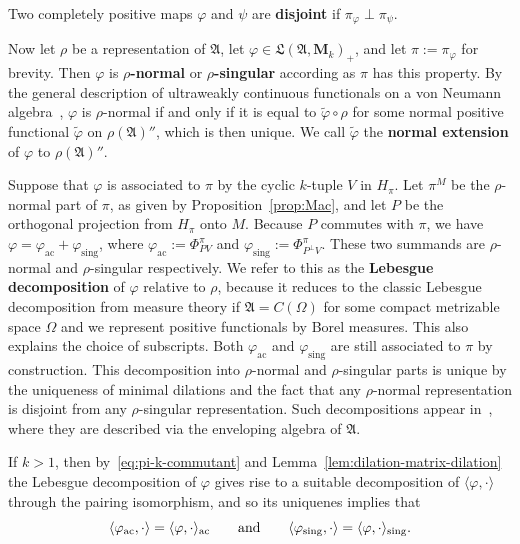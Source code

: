 \documentclass[12pt,a4paper]{article}
\numberwithin{equation}{section}
\theoremstyle{remark}
\renewcommand{\rm}[1]{\mathrm{#1}}
\newcommand{\rmM}{\mathbf{M}}
\newcommand{\A}{\mathfrak{A}}
\newcommand{\frL}{\mathfrak{L}}
\renewcommand{\phi}{\varphi}
\renewcommand{\t}[1]{\widetilde{#1}}
\begin{document}
Two completely positive maps $\phi$ and $\psi$ are \textbf{disjoint} if $\pi_\phi \perp \pi_\psi$.

Now let $\rho$ be a representation of $\A$, let $\phi \in \frL(\A,\rmM_k)_+$, and let $\pi := \pi_\phi$ for brevity.  Then $\phi$ is \textbf{$\rho$-normal} or \textbf{$\rho$-singular} according as $\pi$ has this property.  By the general description of ultraweakly continuous functionals on a von Neumann algebra~\cite[Thm. I.3.1]{Dix--vN}, $\phi$ is $\rho$-normal if and only if it is equal to $\t{\phi}\circ \rho$ for some normal positive functional $\t{\phi}$ on $\rho(\A)''$, which is then unique.  We call $\t{\phi}$ the \textbf{normal extension} of $\phi$ to $\rho(\A)''$.

Suppose that $\phi$ is associated to $\pi$ by the cyclic $k$-tuple $V$ in $H_\pi$. Let $\pi^M$ be the $\rho$-normal part of $\pi$, as given by Proposition~\ref{prop:Mac}, and let $P$ be the orthogonal projection from $H_\pi$ onto $M$.  Because $P$ commutes with $\pi$, we have $\phi = \phi_{\rm{ac}} + \phi_{\rm{sing}}$, where $\phi_{\rm{ac}} := \Phi^\pi_{PV}$ and $\phi_{\rm{sing}} := \Phi^\pi_{P^\perp V}$.  These two summands are $\rho$-normal and $\rho$-singular respectively.  We refer to this as the \textbf{Lebesgue decomposition} of $\phi$ relative to $\rho$, because it reduces to the classic Lebesgue decomposition from measure theory if $\A = C(\Omega)$ for some compact metrizable space $\Omega$ and we represent positive functionals by Borel measures.  This also explains the choice of subscripts.  Both $\phi_{\rm{ac}}$ and $\phi_{\rm{sing}}$ are still associated to $\pi$ by construction. This decomposition into $\rho$-normal and $\rho$-singular parts is unique by the uniqueness of minimal dilations and the fact that any $\rho$-normal representation is disjoint from any $\rho$-singular representation.  Such decompositions appear in~\cite{Tak58}, where they are described via the enveloping algebra of $\A$. %

If $k > 1$, then by~\eqref{eq:pi-k-commutant} and Lemma~\ref{lem:dilation-matrix-dilation} the Lebesgue decomposition of $\phi$ gives rise to a suitable decomposition of $\langle \phi,\cdot\rangle$ through the pairing isomorphism, and so its uniquenes implies that
\begin{equation}\label{eq:pairing-decomp}
\langle\phi_{\rm{ac}},\cdot\rangle = \langle \phi,\cdot\rangle_{\rm{ac}} \qquad \hbox{and} \qquad \langle\phi_{\rm{sing}},\cdot\rangle = \langle \phi,\cdot\rangle_{\rm{sing}}.
\end{equation}
\end{document}
